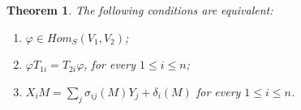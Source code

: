 \documentclass[12pt,a4paper]{article}
\newtheorem{theorem}{Theorem}[section]
\begin{document}
	\begin{theorem} 	\label{Pro ring of endo}
		The following conditions are equivalent: 
		\begin{enumerate}
			\item[(i)] $\varphi \in Hom_S(V_1,V_2)$;
			\item[(ii)]  $\varphi T_{1i}=T_{2i} \varphi$, for every $1\le i \le n$;
			\item[(iii)] $X_iM=\sum_j\sigma_{ij}(M)Y_j+ \delta_i(M)$ for every $1\le i \le n$.
		\end{enumerate}
	\end{theorem}
\end{document}
